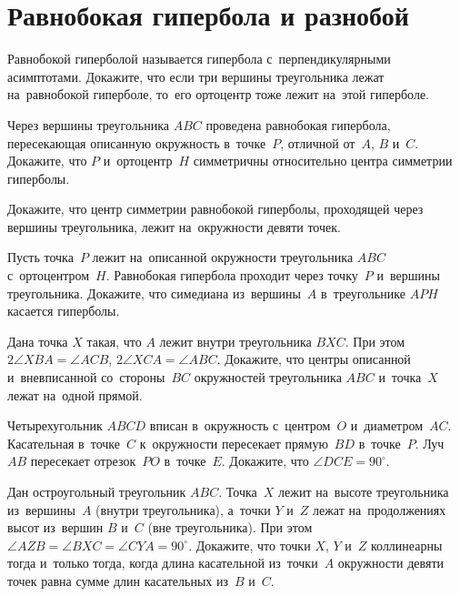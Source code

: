 
\section*{Равнобокая гипербола и разнобой}


\begin{problems}

\item
Равнобокой гиперболой называется гипербола с~перпендикулярными асимптотами.
Докажите, что если три вершины треугольника лежат на~равнобокой гиперболе,
то~его ортоцентр тоже лежит на~этой гиперболе.

\item
Через вершины треугольника $ABC$ проведена равнобокая гипербола, пересекающая
описанную окружность в~точке~$P$, отличной от~$A$, $B$ и~$C$.
Докажите, что $P$ и~ортоцентр~$H$ симметричны относительно центра симметрии
гиперболы.

\item
Докажите, что центр симметрии равнобокой гиперболы, проходящей через вершины
треугольника, лежит на~окружности девяти точек.

\item
Пусть точка~$P$ лежит на~описанной окружности треугольника $ABC$
с~ортоцентром~$H$.
Равнобокая гипербола проходит через точку~$P$ и~вершины треугольника.
Докажите, что симедиана из~вершины~$A$ в~треугольнике $APH$ касается гиперболы.

\item
Дана точка $X$ такая, что $A$ лежит внутри треугольника $BXC$.
При этом $2 \angle XBA = \angle ACB$, $2 \angle XCA = \angle ABC$.
Докажите, что центры описанной и~вневписанной со~стороны~$BC$ окружностей
треугольника $ABC$ и~точка~$X$ лежат на~одной прямой.

\item
Четырехугольник $ABCD$ вписан в~окружность с~центром~$O$ и~диаметром~$AC$.
Касательная в~точке~$C$ к~окружности пересекает прямую~$BD$ в~точке~$P$.
Луч~$AB$ пересекает отрезок~$PO$ в~точке~$E$.
Докажите, что $\angle DCE = 90^\circ$.

\item
Дан остроугольный треугольник $ABC$.
Точка~$X$ лежит на~высоте треугольника из~вершины~$A$ (внутри треугольника),
а~точки $Y$ и~$Z$ лежат на~продолжениях высот из~вершин $B$ и~$C$
(вне треугольника).
При этом $\angle AZB = \angle BXC = \angle CYA = 90^\circ$.
Докажите, что точки $X$, $Y$ и~$Z$ коллинеарны тогда и~только тогда, когда
длина касательной из~точки~$A$ окружности девяти точек равна сумме длин
касательных из~$B$ и~$C$.


\end{problems}
